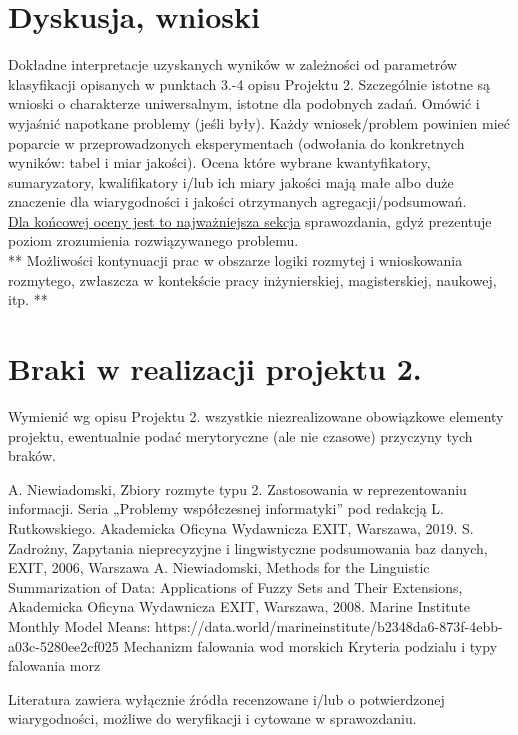 \documentclass{article}
\begin{document}


\section{Dyskusja, wnioski}
Dokładne interpretacje uzyskanych wyników w zależności od parametrów klasyfikacji
opisanych w punktach 3.-4 opisu Projektu 2.
Szczególnie istotne są wnioski o charakterze uniwersalnym, istotne dla podobnych zadań.
Omówić i wyjaśnić napotkane problemy (jeśli były). Każdy wniosek/problem powinien mieć poparcie
w przeprowadzonych eksperymentach (odwołania do konkretnych wyników: tabel i miar
jakości). Ocena które wybrane kwantyfikatory, sumaryzatory, kwalifikatory i/lub ich
miary jakości mają małe albo duże znaczenie dla wiarygodności i jakości otrzymanych
agregacji/podsumowań.  \\
\underline{Dla końcowej oceny jest to najważniejsza sekcja} sprawozdania, gdyż prezentuje poziom
zrozumienia rozwiązywanego problemu.\\

** Możliwości kontynuacji prac w obszarze logiki rozmytej i wnioskowania rozmytego, zwłaszcza w kontekście pracy inżynierskiej,
magisterskiej, naukowej, itp. **\\



\section{Braki w realizacji projektu 2.}
Wymienić wg opisu Projektu 2. wszystkie niezrealizowane obowiązkowe elementy projektu, ewentualnie
podać merytoryczne (ale nie czasowe) przyczyny tych braków.


\begin{thebibliography}{99}
  A. Niewiadomski, Zbiory rozmyte typu 2. Zastosowania w reprezentowaniu informacji.  Seria „Problemy współczesnej informatyki” pod redakcją L. Rutkowskiego. Akademicka Oficyna Wydawnicza EXIT, Warszawa, 2019.
 S. Zadrożny, Zapytania nieprecyzyjne i lingwistyczne podsumowania baz danych, EXIT, 2006, Warszawa
 A. Niewiadomski, Methods for the Linguistic Summarization of Data: Applications of Fuzzy Sets and Their Extensions, Akademicka Oficyna Wydawnicza EXIT, Warszawa, 2008.
 Marine Institute Monthly Model Means: https://data.world/marineinstitute/b2348da6-873f-4ebb-a03c-5280ee2cf025
 Mechanizm falowania wod morskich Kryteria podzialu i typy falowania morz
\end{thebibliography}

Literatura zawiera wyłącznie źródła recenzowane i/lub o potwierdzonej wiarygodności,
możliwe do weryfikacji i cytowane w sprawozdaniu.
\end{document}
